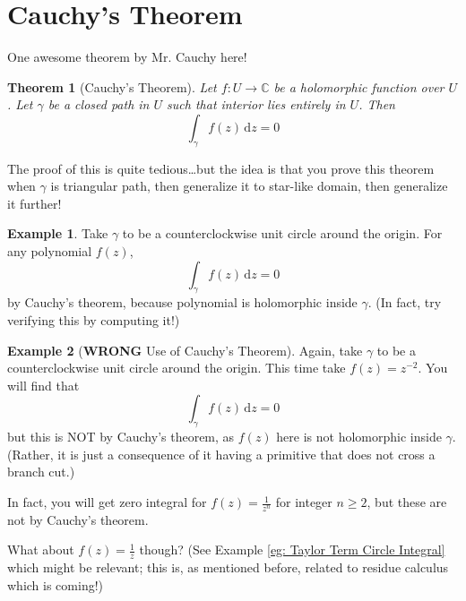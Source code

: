 \documentclass[a4paper, 12pt]{article}
\newtheorem{theorem}{Theorem}
\theoremstyle{definition}
\newtheorem{example}{Example}
\numberwithin{theorem}{section}
\numberwithin{definition}{section}
\numberwithin{exercise}{section}
\numberwithin{remark}{section}
\numberwithin{figure}{section}
\numberwithin{example}{section}
\newcommand{\C}{\mathbb{C}}
\newcommand{\intd}{\,\text{d}}
\begin{document}
\section{Cauchy's Theorem}
One awesome theorem by Mr. Cauchy here!
\begin{theorem}[Cauchy's Theorem]
    Let $f:U \rightarrow \C$ be a holomorphic function over $U$.
    Let $\gamma$ be a closed path in $U$ such that interior lies entirely in $U$.
    Then
    \begin{equation*}
        \int_{\gamma} f(z) \intd z = 0
    \end{equation*}
\end{theorem}
The proof of this is quite tedious\dots but the idea is that
you prove this theorem when $\gamma$ is triangular path,
then generalize it to star-like domain,
then generalize it further!
\begin{example}
    Take $\gamma$ to be a counterclockwise unit circle around the origin.
    For any polynomial $f(z)$,
    \begin{equation*}
        \int_{\gamma} f(z) \intd z = 0
    \end{equation*}
    by Cauchy's theorem, because polynomial is holomorphic inside $\gamma$.
    (In fact, try verifying this by computing it!)
\end{example}
\begin{example}[\textbf{WRONG} Use of Cauchy's Theorem]
    Again, take $\gamma$ to be a counterclockwise unit circle around the origin.
    This time take $f(z) = z^{-2}$.
    You will find that
    \begin{equation*}
        \int_{\gamma} f(z) \intd z = 0
    \end{equation*}
    but this is NOT by Cauchy's theorem, as $f(z)$ here is not holomorphic inside $\gamma$.
    (Rather, it is just a consequence of it having a primitive that does not cross a branch cut.)

    In fact, you will get zero integral for $f(z) = \frac{1}{z^n}$ for integer $n \geq 2$,
    but these are not by Cauchy's theorem.

    What about $f(z) = \frac{1}{z}$ though? (See Example \ref{eg: Taylor Term Circle Integral} which might be relevant;
    this is, as mentioned before, related to residue calculus which is coming!)
\end{example}
\end{document}
